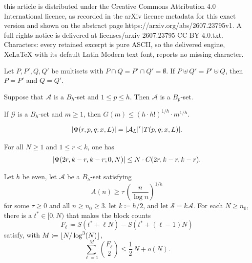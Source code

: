 \documentclass[10pt,a4paper]{amsart}
\DeclarePairedDelimiter{\abs}{\lvert}{\rvert}
\DeclarePairedDelimiter{\floor}{\lfloor}{\rfloor}
\newcommand{\cA}{\mathcal{A}}
\newcommand{\cG}{\mathcal{G}}
\newcommand{\cS}{\mathcal{S}}
\begin{document}
this article is distributed under the Creative Commons Attribution 4.0 International licence, as recorded in the arXiv licence metadata for this exact version and shown on the abstract page https://arxiv.org/abs/2607.23795v1. A full rights notice is delivered at licenses/arxiv-2607.23795-CC-BY-4.0.txt. Characters: every retained excerpt is pure ASCII, so the delivered engine, XeLaTeX with its default Latin Modern text font, reports no missing character.
\begin{lem}\label{lem:cancel}
Let $P,P',Q,Q'$ be multisets with $P\cap Q=P'\cap Q'=\emptyset$.  If $P\uplus Q'=P'\uplus Q$, then $P=P'$ and $Q=Q'$.
\end{lem}

\begin{lem}\label{lem:B_h is B_p}
  Suppose that $\cA$ is a $B_h$-set and $1\le p \le h$. Then $\cA$ is a $B_p$-set. 
\end{lem}

\begin{lem}\label{lem:easy Bh bound}
  If $\cG$ is a $B_h$-set and $m\ge 1$, then $G(m) \le (h\cdot h!)^{1/h} \cdot m^{1/h}$.
\end{lem}

\begin{equation}\label{eq:factor Phi}
   \abs*{\Phi(r ,p,q;x,L)} = \abs*{\cA_L}^r \abs*{T(p,q;x,L)}.
\end{equation}

\begin{lem}\label{lem:Jia in action}
For all $N\ge 1$ and $1\le r <k$, one has
  \[\abs*{\Phi(2r,k-r,k-r;0,N)} \le N \cdot C(2r,k-r,k-r).\]
\end{lem}

\begin{lem}\label{lem:sumset energy bound}
Let $h$ be even, let $\cA$ be a $B_h$-set satisfying 
  \begin{equation}\label{eq:tau appears}
    A(n) \ge \tau \, \left(\frac{n}{\log n}\right)^{1/h}
  \end{equation}
for some $\tau\ge 0$ and all $n\ge n_0\ge 3$. let $k \coloneqq h/2$, and let $\cS=k\cA$. For each $N\ge n_0$, there is a $t^\ast\in [0,N)$ that makes the block counts 
  \[F_\ell\coloneqq S(t^\ast+\ell N) - S(t^\ast+(\ell-1)N)\]
satisfy, with $M\coloneqq \floor{N/\log^3(N)}$,
  \[   \sum_{\ell=1}^{M}\binom{F_\ell}{2} \le \frac{1}{2}\,N + o(N).\]
\end{lem}
\end{document}
